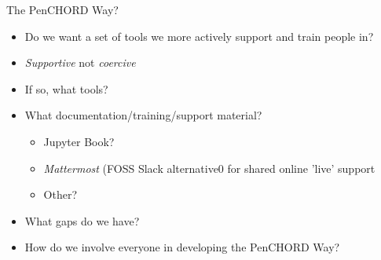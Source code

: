 \documentclass[xcolor={usenames,dvipsnames}]{beamer}
\begin{document}
\begin{frame}{The PenCHORD Way?}

\begin{itemize}
    \setlength\itemsep{3mm}
    \item Do we want a set of tools we more actively support and train people in?
    \item \emph{Supportive} not \emph{coercive}
    \item If so, what tools?
    \item What documentation/training/support material?
    \begin{itemize}
        \item Jupyter Book?
        \item \emph{Mattermost} (FOSS Slack alternative0 for shared online 'live' support
        \item Other?
    \end{itemize}
    \item What gaps do we have?
    \item How do we involve everyone in developing the PenCHORD Way?
\end{itemize}

\end{frame}
\end{document}
